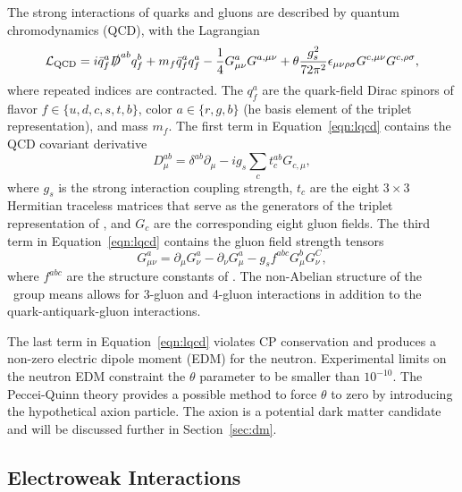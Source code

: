 The strong interactions of quarks and gluons are described by quantum chromodynamics (QCD), with the Lagrangian
\begin{equation}
  \label{eqn:lqcd}
  \mathcal{L}_{\text{QCD}} = i \bar q_f^a \slashed D^{ab} q_f^b + m_f \bar q_f^a q_f^a - \frac{1}{4} G_{\mu\nu}^a G^{a,\mu\nu} + \theta \frac{g_s^2}{72\pi^2} \epsilon_{\mu\nu\rho\sigma} G^{c,\mu\nu} G^{c, \rho\sigma},
\end{equation}
where repeated indices are contracted.
The $q_f^a$ are the quark-field Dirac spinors of flavor $f \in \{u,d,c,s,t,b\}$, color $a \in \{r,g,b\}$ (he basis element of the triplet representation), and mass $m_f$.
The first term in Equation~\ref{eqn:lqcd} contains the QCD covariant derivative
\begin{equation}
  D_{\mu}^{ab} = \delta^{ab} \partial_\mu - i g_s \sum_{c} t_c^{ab} G_{c,\mu},
\end{equation}
where $g_s$ is the strong interaction coupling strength, $t_c$ are the eight $3\times3$ Hermitian traceless matrices that serve as the generators of the triplet representation of \suthree, and $G_c$ are the corresponding eight gluon fields.
The third term in Equation~\ref{eqn:lqcd} contains the gluon field strength tensors
\begin{equation}
  G_{\mu\nu}^a = \partial_\mu G_\nu^a - \partial_\nu G_\mu^a - g_s f^{abc} G_\mu^b G_\nu^C,
\end{equation}
where $f^{abc}$ are the structure constants of \suthree.
The non-Abelian structure of the \suthree\ group means allows for 3-gluon and 4-gluon interactions in addition to the quark-antiquark-gluon interactions.

The last term in Equation~\ref{eqn:lqcd} violates CP conservation and produces a non-zero electric dipole moment (EDM) for the neutron.
Experimental limits on the neutron EDM constraint the $\theta$ parameter to be smaller than $10^{-10}$.
The Peccei-Quinn theory provides a possible method to force $\theta$ to zero by introducing the hypothetical axion particle. The axion is a potential dark matter candidate and will be discussed further in Section~\ref{sec:dm}.

\subsection{Electroweak Interactions}
\label{subsec:ewk}

